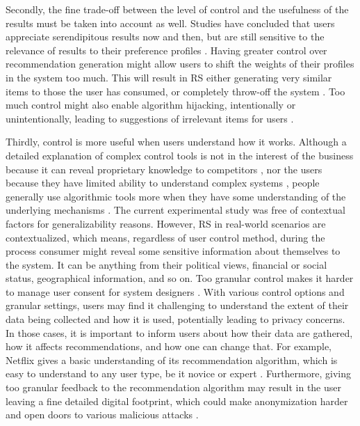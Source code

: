\documentclass[a4paper,12pt]{article}
\begin{document}
Secondly, the fine trade-off between the level of control and the usefulness of the results must be taken into account as well. Studies have concluded that users appreciate serendipitous results now and then, but are still sensitive to the relevance of results to their preference profiles \citep{kotkovSurveySerendipityRecommender2016}. Having greater control over recommendation generation might allow users to shift the weights of their profiles in the system too much. This will result in RS either generating very similar items to those the user has consumed, or completely throw-off the system \citep{mantovani2019meta}. Too much control might also enable algorithm hijacking, intentionally or unintentionally, leading to suggestions of irrelevant items for users \citep{xing2013take}. 

Thirdly, control is more useful when users understand how it works. Although a detailed explanation of complex control tools is not in the interest of the business because it can reveal proprietary knowledge to competitors \citep{lubit2001tacit}, nor the users because they have limited ability to understand complex systems \citep{kahneman1979interpretation}, people generally use algorithmic tools more when they have some understanding of the underlying mechanisms \citep{guidotti2018survey}. The current experimental study was free of contextual factors for generalizability reasons. However, RS in real-world scenarios are contextualized, which means, regardless of user control method, during the process consumer might reveal some sensitive information about themselves to the system. It can be anything from their political views, financial or social status, geographical information, and so on. Too granular control makes it harder to manage user consent for system designers \citep{belanger2011privacy}. With various control options and granular settings, users may find it challenging to understand the extent of their data being collected and how it is used, potentially leading to privacy concerns. In those cases, it is important to inform users about how their data are gathered, how it affects recommendations, and how one can change that. For example, Netflix gives a basic understanding of its recommendation algorithm, which is easy to understand to any user type, be it novice or expert \citep{netflix_help_page}. Furthermore, giving too granular feedback to the recommendation algorithm may result in the user leaving a fine detailed digital footprint, which could make anonymization harder and open doors to various malicious attacks \citep{sweeney2002k}.
\end{document}
